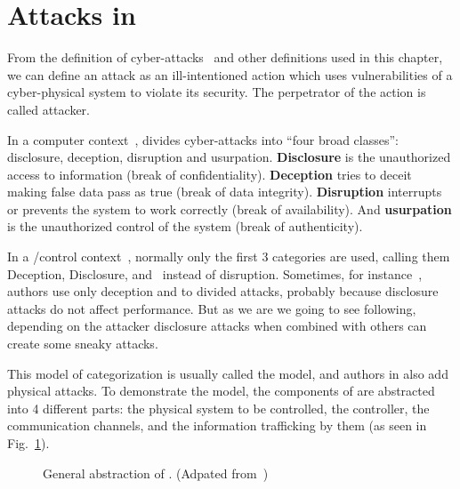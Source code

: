 \documentclass[../main.tex]{subfiles}
\begin{document}
\section{Attacks in \cps{}}\label{sec:attacks}

From the definition of cyber-attacks~\cite{Bishop2005} and other
definitions used in this chapter, we can define an attack as an ill-intentioned action which uses vulnerabilities of a cyber-physical system to violate its security.
The perpetrator of the action is called attacker.

In a computer context~\cite{Bishop2005},  divides cyber-attacks into ``four broad classes'':
disclosure, deception, disruption and usurpation.
\textbf{Disclosure} is the unauthorized access to information (break of confidentiality).
\textbf{Deception} tries to deceit making false data pass as true (break of data integrity).
\textbf{Disruption} interrupts or prevents the system to work correctly (break of availability). And \textbf{usurpation} is the unauthorized control of the system (break of authenticity).

In a \cps{}/control context~\cite{CardenasEtAl2008}, normally only the first 3 categories are used, calling them Deception, Disclosure, and~\DoS{} instead of disruption.
Sometimes, for instance~\cite{AminEtAl2009}, authors use only deception and \DoS{} to divided attacks, probably because disclosure attacks do not affect performance.
But as we are we going to see following, depending on the attacker disclosure attacks when combined with others can create some sneaky attacks.

This model of categorization is usually called the \DDD{} model, and authors in \cps{} also add physical attacks. To demonstrate the \DDD{} model, the components of
\cps{} are abstracted into 4 different parts: the physical system to be controlled, the controller, the communication channels, and the information trafficking by them  (as seen in Fig.~\ref{fig:cps_abstraction}).

\begin{figure}[h]
  \centering
\caption[General abstraction of CPS.]{General abstraction of \cps{}. (Adpated from~\cite{CardenasEtAl2008,AminEtAl2009})}\label{fig:cps_abstraction}
\end{figure}
\end{document}
